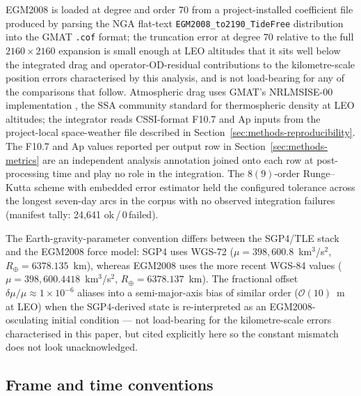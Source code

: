 \documentclass[10pt, letterpaper]{article}
\begin{document}
EGM2008 is loaded at degree and order $70$ from a project-installed
coefficient file produced by parsing the NGA flat-text
\texttt{EGM2008\_to2190\_TideFree} distribution into the GMAT
\texttt{.cof} format; the truncation error at degree $70$ relative
to the full $2160\!\times\!2160$ expansion is small enough at LEO
altitudes \citep{pavlis2012} that it sits well below the integrated
drag and operator-OD-residual contributions to the kilometre-scale
position errors characterised by this analysis, and is not
load-bearing for any of the comparisons that follow. Atmospheric drag uses GMAT's NRLMSISE-00
implementation \citep{picone2002}, the SSA community standard for
thermospheric density at LEO altitudes; the integrator reads CSSI-format
F10.7 and Ap inputs from the project-local space-weather file described
in Section~\ref{sec:methods-reproducibility}. The F10.7 and Ap values
reported per output row in Section~\ref{sec:methods-metrics} are an
independent analysis annotation joined onto each row at
post-processing time and play no role in the integration. The $8(9)$-order Runge--Kutta scheme
with embedded error estimator \citep{verner1978} held the configured
tolerance across the longest seven-day arcs in the corpus with no
observed integration failures (manifest tally: 24{,}641
ok\,/\,$0$\,failed).

The Earth-gravity-parameter convention differs between the
SGP4/TLE stack and the EGM2008 force model: SGP4 uses WGS-72
($\mu = 398{,}600.8$~km$^3$/s$^2$, $R_{\oplus} = 6378.135$~km),
whereas EGM2008 uses the more recent WGS-84 values
($\mu = 398{,}600.4418$~km$^3$/s$^2$, $R_{\oplus} = 6378.137$~km).
The fractional offset $\delta\mu / \mu \approx 1\times 10^{-6}$
aliases into a semi-major-axis bias of similar order
($\mathcal{O}(10)$~m at LEO) when the SGP4-derived state is
re-interpreted as an EGM2008-osculating initial condition --- not
load-bearing for the kilometre-scale errors characterised in this
paper, but cited explicitly here so the constant mismatch does
not look unacknowledged.

\subsection{Frame and time conventions}
\label{sec:methods-frame-time}
\end{document}

